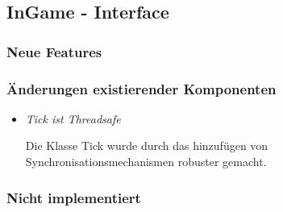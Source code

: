 \subsection{InGame - Interface}

\subsubsection{Neue Features}
\subsubsection{Änderungen existierender Komponenten}
\begin{itemize}
    \item \textit{Tick ist Threadsafe}
        \begin{leftbar}[0.9\linewidth]
            Die Klasse Tick wurde durch das hinzufügen von Synchronisationsmechanismen robuster gemacht.
        \end{leftbar}
\end{itemize}
\subsubsection{Nicht implementiert}